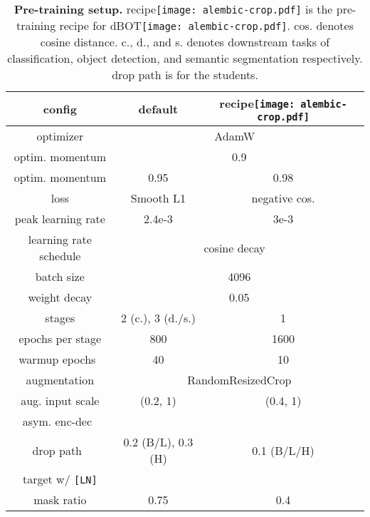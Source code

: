 \documentclass[10pt,twocolumn,letterpaper]{article}
\def \alambic {\texttt{[image: alembic-crop.pdf]}\xspace}
\def\ourmethoddis{dBOT\alambic\xspace}
\begin{document}
\begin{table}[t]
    \begin{center}
    \setlength{\tabcolsep}{0.5mm}
	\begin{tabular}{c|cc}
	\toprule
		config & default & \hspace{0.6cm} recipe\alambic \hspace{0.6cm} \\
		\hline
		optimizer & \multicolumn{2}{c}{AdamW ~\cite{adamw}} \\
		optim. momentum  & \multicolumn{2}{c}{0.9} \\
		optim. momentum  & 0.95 & 0.98 \\
		loss & Smooth L1 & negative cos. \\
		peak learning rate & 2.4e-3 & 3e-3 \\
		learning rate schedule & \multicolumn{2}{c}{cosine decay ~\cite{cosinedecay}} \\
		batch size & \multicolumn{2}{c}{4096} \\
		weight decay & \multicolumn{2}{c}{0.05} \\
		stages & 2 (c.), 3 (d./s.)  & 1 \\
		epochs per stage & 800  & 1600 \\
		warmup epochs~\cite{warmup} & 40  & 10 \\
		augmentation & \multicolumn{2}{c}{RandomResizedCrop} \\
		aug. input scale & (0.2, 1) & (0.4, 1) \\
		asym. enc-dec~\cite{mae} & \cmark  & \xmark\\
		drop path~\cite{droppath} & 0.2 (B/L), 0.3 (H) & 0.1 (B/L/H) \\
		target w/ \texttt{[LN]} & \xmark & \cmark \\
		mask ratio & 0.75  & 0.4 \\
	\bottomrule
	\end{tabular}
        \end{center}
	\caption{\textbf{Pre-training setup.} recipe\alambic is the pre-training recipe for \ourmethoddis. cos. denotes cosine distance. c., d., and s. denotes downstream tasks of classification, object detection, and semantic segmentation respectively. drop path is for the students.}
	\label{tab:app:presetting}
\end{table}
\end{document}
